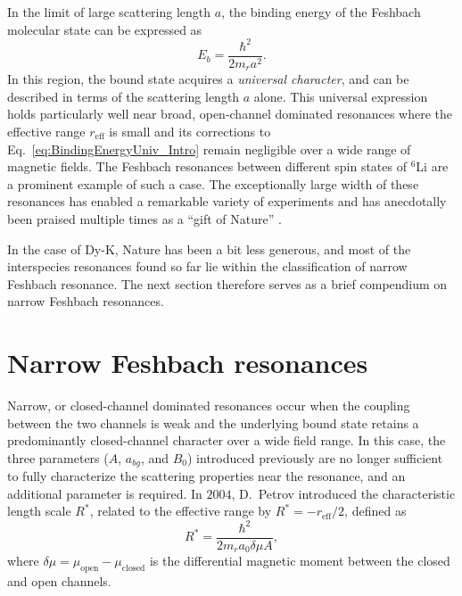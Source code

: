 In the limit of large scattering length $a$, the binding energy of the Feshbach molecular state can be expressed as
\begin{equation}
	E_b=\frac{\hbar^2}{2m_ra^2}.
	\label{eq:BindingEnergyUniv_Intro}
\end{equation}
In this region, the bound state acquires a \textit{universal character}, and can be described in terms of the scattering length $a$ alone. This universal expression holds particularly well near broad, open-channel dominated resonances where the effective range $r_{\mathrm{eff}}$ is small and its corrections to Eq.~\eqref{eq:BindingEnergyUniv_Intro} remain negligible over a wide range of magnetic fields. The Feshbach resonances between different spin states of $^6$Li are a prominent example of such a case. The exceptionally large width of these resonances has enabled a remarkable variety of experiments and has anecdotally been praised multiple times as a ``gift of Nature'' \cite{Varenna2006book}.

In the case of Dy-K, Nature has been a bit less generous, and most of the interspecies resonances found so far lie within the classification of narrow Feshbach resonance. The next section therefore serves as a brief compendium on narrow Feshbach resonances.



\section{Narrow Feshbach resonances}
\label{sec:NarrowFR}

Narrow,  or closed-channel dominated resonances occur when the coupling between the two channels is weak and the underlying bound state retains a predominantly closed-channel character over a wide field range. In this case, the three parameters  ($A$, $a_{bg}$, and $B_0$) introduced previously are no longer sufficient to fully characterize the scattering properties near the resonance, and an additional parameter is required. In $2004$, D.~Petrov introduced the characteristic length scale $R^*$, related to the effective range by $R^*=-r_{\mathrm{eff}}/2$, defined as \cite{Petrov2004tbp}
\begin{equation}\label{eq:Rstar}
	R^*=\frac{\hbar^2}{2m_ra_0\delta\mu A},
\end{equation}
where $\delta\mu=\mu_{\mathrm{open}}-\mu_{\mathrm{closed}}$ is the differential magnetic moment between the closed and open channels.


